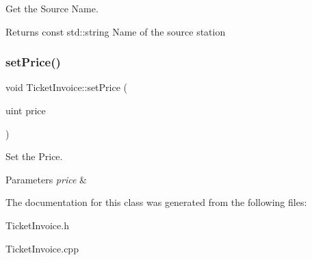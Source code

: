 Get the Source Name. 

\begin{DoxyReturn}{Returns}
const std\+::string Name of the source station 
\end{DoxyReturn}
\mbox{\label{classTicketInvoice_afeed9962f0276861876a001e372d2063}} 
\subsubsection{\texorpdfstring{set\+Price()}{setPrice()}}
{\footnotesize\ttfamily void Ticket\+Invoice\+::set\+Price (\begin{DoxyParamCaption}\item[{uint}]{price }\end{DoxyParamCaption})}



Set the Price. 


\begin{DoxyParams}{Parameters}
{\em price} & \\
\hline
\end{DoxyParams}


The documentation for this class was generated from the following files\+:\begin{DoxyCompactItemize}
\item 
Ticket\+Invoice.\+h\item 
Ticket\+Invoice.\+cpp\end{DoxyCompactItemize}
